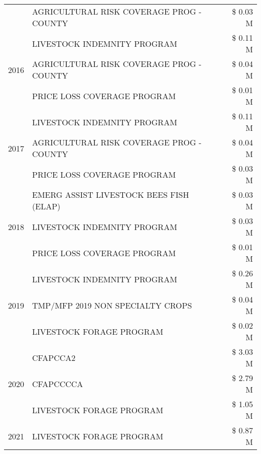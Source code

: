 \begin{tabular}{llr}
 & AGRICULTURAL RISK COVERAGE PROG - COUNTY & \$ 0.03 M \\
\cline{1-3}
\multirow[t]{3}{*}{2016} & LIVESTOCK INDEMNITY PROGRAM & \$ 0.11 M \\
 & AGRICULTURAL RISK COVERAGE PROG - COUNTY & \$ 0.04 M \\
 & PRICE LOSS COVERAGE PROGRAM & \$ 0.01 M \\
\cline{1-3}
\multirow[t]{3}{*}{2017} & LIVESTOCK INDEMNITY PROGRAM & \$ 0.11 M \\
 & AGRICULTURAL RISK COVERAGE PROG - COUNTY & \$ 0.04 M \\
 & PRICE LOSS COVERAGE PROGRAM & \$ 0.03 M \\
\cline{1-3}
\multirow[t]{3}{*}{2018} & EMERG ASSIST LIVESTOCK BEES FISH (ELAP) & \$ 0.03 M \\
 & LIVESTOCK INDEMNITY PROGRAM & \$ 0.03 M \\
 & PRICE LOSS COVERAGE PROGRAM & \$ 0.01 M \\
\cline{1-3}
\multirow[t]{3}{*}{2019} & LIVESTOCK INDEMNITY PROGRAM & \$ 0.26 M \\
 & TMP/MFP 2019 NON SPECIALTY CROPS & \$ 0.04 M \\
 & LIVESTOCK FORAGE PROGRAM & \$ 0.02 M \\
\cline{1-3}
\multirow[t]{3}{*}{2020} & CFAPCCA2 & \$ 3.03 M \\
 & CFAPCCCCA & \$ 2.79 M \\
 & LIVESTOCK FORAGE PROGRAM & \$ 1.05 M \\
\cline{1-3}
2021 & LIVESTOCK FORAGE PROGRAM & \$ 0.87 M \\
\cline{1-3}
\bottomrule
\end{tabular}
